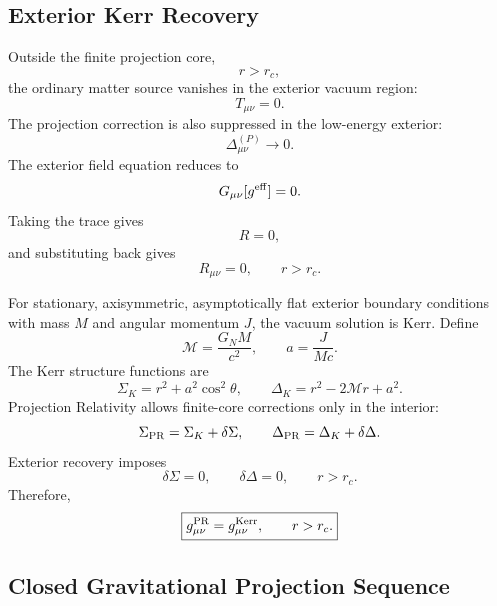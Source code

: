 \documentclass[11pt]{article}
\begin{document}
\subsection{Exterior Kerr Recovery}

Outside the finite projection core,
\begin{equation}
r>r_c,
\end{equation}
the ordinary matter source vanishes in the exterior vacuum region:
\begin{equation}
T_{\mu\nu}=0.
\end{equation}
The projection correction is also suppressed in the low-energy exterior:
\begin{equation}
\Delta_{\mu\nu}^{(P)}\rightarrow0.
\end{equation}
The exterior field equation reduces to
\begin{equation}
G_{\mu\nu}[g^{\rm eff}]=0.
\end{equation}
Taking the trace gives
\begin{equation}
R=0,
\end{equation}
and substituting back gives
\begin{equation}
\boxed{
R_{\mu\nu}=0,
\qquad
r>r_c.
}
\end{equation}

For stationary, axisymmetric, asymptotically flat exterior boundary conditions
with mass \(M\) and angular momentum \(J\), the vacuum solution is Kerr. Define
\begin{equation}
\mathcal M
=
\frac{G_NM}{c^2},
\qquad
a
=
\frac{J}{Mc}.
\end{equation}
The Kerr structure functions are
\begin{equation}
\Sigma_K
=
r^2+a^2\cos^2\theta,
\qquad
\Delta_K
=
r^2-2\mathcal M r+a^2.
\end{equation}
Projection Relativity allows finite-core corrections only in the interior:
\begin{equation}
\Sigma_{\rm PR}
=
\Sigma_K+\delta\Sigma,
\qquad
\Delta_{\rm PR}
=
\Delta_K+\delta\Delta.
\end{equation}
Exterior recovery imposes
\begin{equation}
\boxed{
\delta\Sigma=0,
\qquad
\delta\Delta=0,
\qquad
r>r_c.
}
\end{equation}
Therefore,
\begin{equation}
\boxed{
g_{\mu\nu}^{\rm PR}
=
g_{\mu\nu}^{\rm Kerr},
\qquad
r>r_c.
}
\end{equation}

\subsection{Closed Gravitational Projection Sequence}
\end{document}
